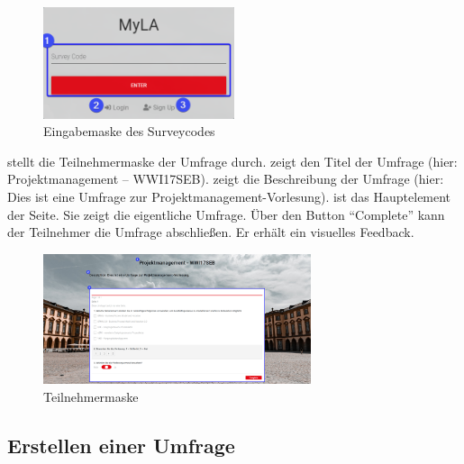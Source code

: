 
\begin{figure}[H]
	\centering
	\includegraphics[width=0.5\textwidth, keepaspectratio]{img/guide/SurveyCode.png}
	\captionsetup{justification=centering, format=plain}
	\caption[Eingabemaske Surveycode]{Eingabemaske des Surveycodes \\\quelleScreenshot}
	\label{fig:EingabemaskeSurveycode}
\end{figure}

\abb {} stellt die Teilnehmermaske der Umfrage durch. 
\desOne zeigt den Titel der Umfrage (hier: Projektmanagement -- WWI17SEB). 
\desTwo zeigt die Beschreibung der Umfrage (hier: Dies ist eine Umfrage zur Projektmanagement-Vorlesung). 
\desThree ist das Hauptelement der Seite.
Sie zeigt die eigentliche Umfrage.
Über den Button \enquote{Complete} kann der Teilnehmer die Umfrage abschließen. 
Er erhält ein visuelles Feedback. 

\begin{figure}[H]
	\centering
	\includegraphics[width=0.70\textwidth, keepaspectratio]{img/guide/SurveyParticipate.png}
	\captionsetup{justification=centering, format=plain}
	\caption[Teilnehmermaske]{Teilnehmermaske \\\quelleScreenshot}
	\label{fig:Teilnehmermaske}
\end{figure}

\subsection{Erstellen einer Umfrage}
\label{ssec:CreateMaster}

